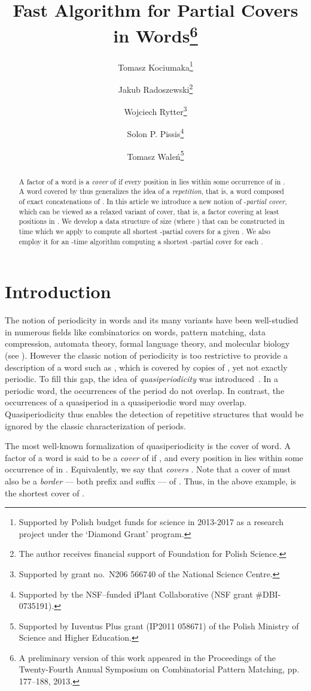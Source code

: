 \documentclass{article}
\title{
    Fast Algorithm for Partial Covers in Words\footnote{
      A preliminary version of this work appeared in the Proceedings of
      the Twenty-Fourth Annual Symposium on Combinatorial Pattern Matching, pp. 177--188, 2013.
    }
  }
\date{}
\author[1]{Tomasz Kociumaka\thanks{
    Supported by Polish budget funds for science in 2013-2017 as a research project under the `Diamond Grant' program.
    }}
\author[1]{Jakub Radoszewski\thanks{The author receives financial support of Foundation for Polish Science.}}
\author[1,2]{Wojciech Rytter\thanks{Supported by grant no.\ N206 566740 of the National Science Centre.}}
\author[3]{Solon P. Pissis\thanks{Supported by the NSF--funded iPlant Collaborative (NSF grant \#DBI-0735191).}}
\author[1]{Tomasz Wale\'n\thanks{Supported by Iuventus Plus grant (IP2011 058671) of the Polish Ministry of Science and Higher Education.}}
\affil[1]{Faculty of Mathematics, Informatics and Mechanics, University of Warsaw, Poland, \texttt{[kociumaka, jrad, rytter, walen]@mimuw.edu.pl}}
\affil[2]{Faculty of Mathematics and Computer Science, Copernicus University, Toru\'n, Poland}
\affil[3]{Department of Informatics, King's College London, UK, \texttt{solon.pissis@h-its.org}}
\theoremstyle{theorem}
\theoremstyle{definition}
\begin{document}
\maketitle
  \begin{abstract}
    A factor  of a word  is a \emph{cover} of  if every position in  lies within some occurrence of  in .
    A word  covered by  thus generalizes the
    idea of a \emph{repetition}, that is, a word composed of exact concatenations of .
    In this article we introduce a new notion of
    -\emph{partial cover}, which can be viewed as a relaxed variant
    of cover, that is, a factor covering at least  positions in .
    We develop a data structure of  size (where ) that can be constructed in  time
    which we apply to compute all shortest -partial covers for a given .
    We also employ it for an -time algorithm computing a shortest -partial cover
    for each .
  \end{abstract}



    \section{Introduction}
    The notion of periodicity in words and its many variants have been well-studied in numerous
    fields like combinatorics on words, pattern matching, data compression, automata theory,
    formal language theory, and molecular biology (see \cite{DBLP:journals/tcs/CrochemoreIR09}).
    However the classic notion of
    periodicity is too restrictive to provide a description of a word such as
    , which is covered by copies of , yet not exactly periodic.
    To fill this gap, the idea of \emph{quasiperiodicity} was introduced~\cite{Apo93}.
    In a periodic word, the occurrences of the period do not overlap. In contrast,
    the occurrences of a quasiperiod in a quasiperiodic word may overlap.
    Quasiperiodicity thus enables the
    detection of repetitive structures that would be ignored by the classic characterization
    of periods.

    The most well-known formalization of quasiperiodicity is the cover of word.
    A factor  of a word  is said to be
    a \emph{cover} of  if , and every position in  lies within
    some occurrence of  in .
    Equivalently, we say that  \emph{covers} . Note that a cover of  must also be
    a \emph{border} --- both prefix and suffix --- of .
    Thus, in the above example,  is the shortest cover of .
\end{document}
